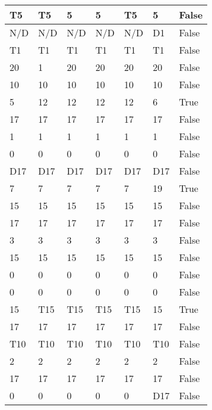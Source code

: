 \begin{longtable}[htbp]{| p{} | p{} | p{}| p{}| p{}| p{}| p{}|}
\multicolumn{1}{|l|}{T5} & \multicolumn{1}{l|}{T5} & 5 & 5 & \multicolumn{1}{l|}{T5} & 5 & False \\ \hline
\multicolumn{1}{|l|}{N/D} & \multicolumn{1}{l|}{N/D} & \multicolumn{1}{l|}{N/D} & \multicolumn{1}{l|}{N/D} & \multicolumn{1}{l|}{N/D} & \multicolumn{1}{l|}{D1} & False \\ \hline
\multicolumn{1}{|l|}{T1} & \multicolumn{1}{l|}{T1} & \multicolumn{1}{l|}{T1} & \multicolumn{1}{l|}{T1} & \multicolumn{1}{l|}{T1} & \multicolumn{1}{l|}{T1} & False \\ \hline
20 & 1 & 20 & 20 & 20 & 20 & False \\ \hline
10 & 10 & 10 & 10 & 10 & 10 & False \\ \hline
5 & 12 & 12 & 12 & 12 & 6 & True \\ \hline
17 & 17 & 17 & 17 & 17 & 17 & False \\ \hline
1 & 1 & 1 & 1 & 1 & 1 & False \\ \hline
0 & 0 & 0 & 0 & 0 & 0 & False \\ \hline
\multicolumn{1}{|l|}{D17} & \multicolumn{1}{l|}{D17} & \multicolumn{1}{l|}{D17} & \multicolumn{1}{l|}{D17} & \multicolumn{1}{l|}{D17} & \multicolumn{1}{l|}{D17} & False \\ \hline
7 & 7 & 7 & 7 & 7 & 19 & True \\ \hline
15 & 15 & 15 & 15 & 15 & 15 & False \\ \hline
17 & 17 & 17 & 17 & 17 & 17 & False \\ \hline
3 & 3 & 3 & 3 & 3 & 3 & False \\ \hline
15 & 15 & 15 & 15 & 15 & 15 & False \\ \hline
0 & 0 & 0 & 0 & 0 & 0 & False \\ \hline
0 & 0 & 0 & 0 & 0 & 0 & False \\ \hline
15 & \multicolumn{1}{l|}{T15} & \multicolumn{1}{l|}{T15} & \multicolumn{1}{l|}{T15} & \multicolumn{1}{l|}{T15} & 15 & True \\ \hline
17 & 17 & 17 & 17 & 17 & 17 & False \\ \hline
\multicolumn{1}{|l|}{T10} & \multicolumn{1}{l|}{T10} & \multicolumn{1}{l|}{T10} & \multicolumn{1}{l|}{T10} & \multicolumn{1}{l|}{T10} & \multicolumn{1}{l|}{T10} & False \\ \hline
2 & 2 & 2 & 2 & 2 & 2 & False \\ \hline
17 & 17 & 17 & 17 & 17 & 17 & False \\ \hline
0 & 0 & 0 & 0 & 0 & \multicolumn{1}{l|}{D17} & False \\ \hline

\end{longtable}
